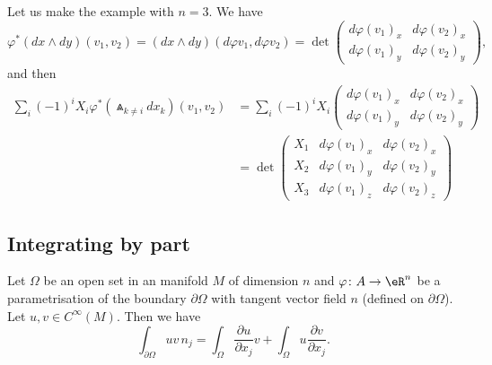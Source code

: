
\begin{example}
	Let us make the example with \( n=3\). We have
	\begin{equation}
		\varphi^*(dx\wedge dy)(v_1,v_2)=(dx\wedge dy)(d\varphi v_1 , d\varphi v_2)=\det
		\begin{pmatrix}
			d\varphi(v_1)_x & d\varphi(v_2)_x \\
			d\varphi(v_1)_y & d\varphi(v_2)_y
		\end{pmatrix},
	\end{equation}
	and then
	\begin{subequations}
		\begin{align}
			\sum_i(-1)^iX_i \varphi^*(   \Wedge_{k\neq i}dx_k    )(v_1,v_2) & =\sum_i(-1)^iX_i
			\begin{pmatrix}
				d\varphi(v_1)_x & d\varphi(v_2)_x \\
				d\varphi(v_1)_y & d\varphi(v_2)_y
			\end{pmatrix}
			\\ &=
			\det\begin{pmatrix}
				    X_1 & d\varphi (v_1)_x & d\varphi(v_2)_x \\
				    X_2 & d\varphi (v_1)_y & d\varphi(v_2)_y \\
				    X_3 & d\varphi (v_1)_z & d\varphi(v_2)_z
			    \end{pmatrix}
		\end{align}
	\end{subequations}
\end{example}

\subsection{Integrating by part}

\begin{proposition}
	Let \( \Omega\) be an open set in an manifold \( M\) of dimension \( n\) and \( \varphi\colon A\to \eR^n\) be a parametrisation of the boundary \( \partial\Omega\) with tangent vector field \( n\) (defined on \( \partial\Omega\)). Let \( u,v\in  C^{\infty}(M)\). Then we have
	\begin{equation}        \label{EQooQSMNooKHwbqp}
		\int_{\partial \Omega}uv\,n_j=\int_{\Omega}\frac{ \partial u }{ \partial x_j }v+\int_{\Omega}u\frac{ \partial v }{ \partial x_j }.
	\end{equation}
\end{proposition}

